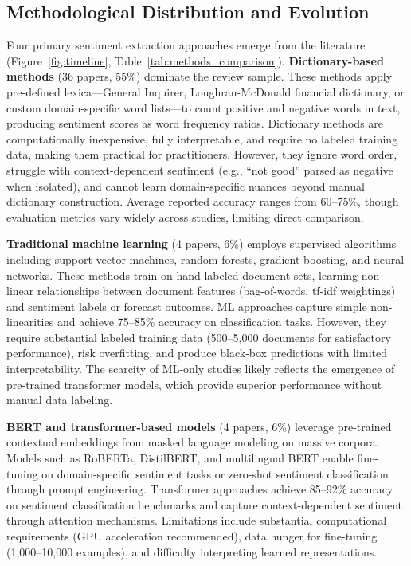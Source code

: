 \subsection{Methodological Distribution and Evolution}

Four primary sentiment extraction approaches emerge from the literature (Figure~\ref{fig:timeline}, Table~\ref{tab:methods_comparison}). \textbf{Dictionary-based methods} (36 papers, 55\%) dominate the review sample. These methods apply pre-defined lexica---General Inquirer, Loughran-McDonald financial dictionary, or custom domain-specific word lists---to count positive and negative words in text, producing sentiment scores as word frequency ratios. Dictionary methods are computationally inexpensive, fully interpretable, and require no labeled training data, making them practical for practitioners. However, they ignore word order, struggle with context-dependent sentiment (e.g., ``not good'' parsed as negative when isolated), and cannot learn domain-specific nuances beyond manual dictionary construction. Average reported accuracy ranges from 60--75\%, though evaluation metrics vary widely across studies, limiting direct comparison.

\textbf{Traditional machine learning} (4 papers, 6\%) employs supervised algorithms including support vector machines, random forests, gradient boosting, and neural networks. These methods train on hand-labeled document sets, learning non-linear relationships between document features (bag-of-words, tf-idf weightings) and sentiment labels or forecast outcomes. ML approaches capture simple non-linearities and achieve 75--85\% accuracy on classification tasks. However, they require substantial labeled training data (500--5,000 documents for satisfactory performance), risk overfitting, and produce black-box predictions with limited interpretability. The scarcity of ML-only studies likely reflects the emergence of pre-trained transformer models, which provide superior performance without manual data labeling.

\textbf{BERT and transformer-based models} (4 papers, 6\%) leverage pre-trained contextual embeddings from masked language modeling on massive corpora. Models such as RoBERTa, DistilBERT, and multilingual BERT enable fine-tuning on domain-specific sentiment tasks or zero-shot sentiment classification through prompt engineering. Transformer approaches achieve 85--92\% accuracy on sentiment classification benchmarks and capture context-dependent sentiment through attention mechanisms. Limitations include substantial computational requirements (GPU acceleration recommended), data hunger for fine-tuning (1,000--10,000 examples), and difficulty interpreting learned representations.

